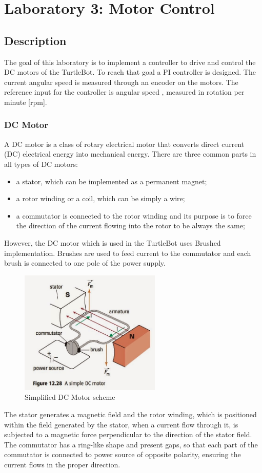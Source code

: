 \documentclass[english]{article}
\begin{document}
\clearpage

\section{Laboratory 3: Motor Control}
\subsection{Description}
The goal of this laboratory is to implement a controller to drive and 
control the DC motors of the TurtleBot. To reach that goal a PI controller is designed.
 The current angular speed is measured through an encoder on the motors. 
 The reference input for the controller is angular speed , 
 measured in rotation per minute [rpm].
\subsubsection{DC Motor}
A DC motor is a class of rotary electrical motor that converts direct current (DC)
electrical energy into mechanical energy. There are three common parts in all types
of DC motors: 
\begin{itemize}
    \item a stator, which can be implemented as a permanent magnet; 
    \item a rotor winding or a coil, which can be simply a wire; 
    \item a commutator is connected to the rotor winding and its purpose is to force 
    the direction of the current flowing into the rotor to be always the same; 
\end{itemize}
However, the DC motor which is used in the TurtleBot uses Brushed implementation.
Brushes are used to feed current to the commutator and each brush is connected to
one pole of the power supply. 
\begin{figure}[!h]
    \centering
    \includegraphics[width=0.60\textwidth, height=0.30\textheight]{figures/motorfig.png}
    \caption{Simplified DC Motor scheme}
    \label{fig:motorfig}
\end{figure}
The stator generates a magnetic field and the rotor winding, which is positioned within
 the field generated by the stator, when a current flow through it, is subjected to a 
 magnetic force perpendicular to the direction of the stator field. The commutator has
  a ring-like shape and present gaps, so that each part of the commutator is connected
to power source of opposite polarity, ensuring the current flows in the proper
   direction. 
\end{document}
